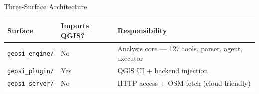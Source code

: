 \documentclass[aspectratio=169,11pt]{beamer}
\begin{document}
\begin{frame}{Three-Surface Architecture}

  \vspace{0.3em}
  \footnotesize
  \begin{tabular}{@{}lll@{}}
    \toprule
    \textbf{Surface} & \textbf{Imports QGIS?} & \textbf{Responsibility} \\ \midrule
    \texttt{geosi\_engine/} & No & Analysis core --- 127 tools, parser, agent, executor \\
    \texttt{geosi\_plugin/} & Yes & QGIS UI + backend injection \\
    \texttt{geosi\_server/} & No & HTTP access + OSM fetch (cloud-friendly) \\
    \bottomrule
  \end{tabular}
\end{frame}
\end{document}
